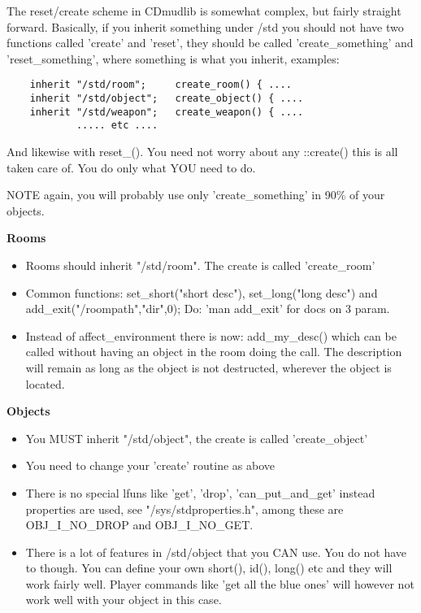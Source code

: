 The reset/create scheme in CDmudlib is somewhat complex, but fairly straight
forward. Basically, if you inherit something under /std you should not have two
functions called 'create' and 'reset', they should be called 'create\_something'
and 'reset\_something', where something is what you inherit, examples:

\begin{verbatim}
    inherit "/std/room";     create_room() { ....
    inherit "/std/object";   create_object() { ....
    inherit "/std/weapon";   create_weapon() { ....
            ..... etc ....
\end{verbatim}

And likewise with reset\_(). You need not worry about any ::create() this is
all taken care of. You do only what YOU need to do.

NOTE again, you will probably use only 'create\_something' in 90\% of
your objects.

{\bf Rooms}

\begin{itemize}
\item Rooms should inherit "/std/room". The create is called 'create\_room'
\item Common functions:  set\_short("short desc"), set\_long("long desc") and \\
  add\_exit("/roompath","dir",0); Do: 'man add\_exit' for docs on 3 param.
\item Instead of affect\_environment there is now: add\_my\_desc() which can be
  called without having an object in the room doing the call. The description
  will remain as long as the object is not destructed, wherever the object
  is located.
\end{itemize}

{\bf Objects}

\begin{itemize}
\item You MUST inherit "/std/object", the create is called 'create\_object'
\item You need to change your 'create' routine as above
\item There is no special lfuns like 'get', 'drop', 'can\_put\_and\_get' instead
  properties are used, see "/sys/stdproperties.h", among these are
  OBJ\_I\_NO\_DROP and OBJ\_I\_NO\_GET.
\item There is a lot of features in /std/object that you CAN use. You do not
  have to though. You can define your own short(), id(), long() etc and
  they will work fairly well. Player commands like 'get all the blue ones' will
  however not work well with your object in this case.
\end{itemize}

